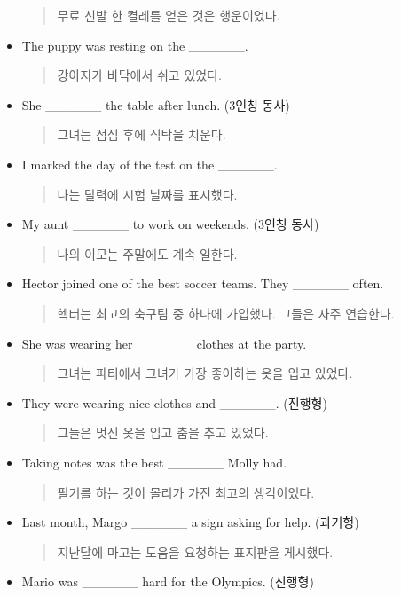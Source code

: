\documentclass{article}
\begin{document}
\begin{addmargin}[1em]{1em}
\begin{itemize}
    \begin{quote}
    무료 신발 한 켤레를 얻은 것은 행운이었다.
    \end{quote}
    \item The puppy was resting on the \_\_\_\_\_\_.
    \begin{quote}
    강아지가 바닥에서 쉬고 있었다.
    \end{quote}
    \item She \_\_\_\_\_\_ the table after lunch. (3인칭 동사)
    \begin{quote}
    그녀는 점심 후에 식탁을 치운다.
    \end{quote}
    \item I marked the day of the test on the \_\_\_\_\_\_.
    \begin{quote}
    나는 달력에 시험 날짜를 표시했다.
    \end{quote}
    \item My aunt \_\_\_\_\_\_ to work on weekends. (3인칭 동사)
    \begin{quote}
    나의 이모는 주말에도 계속 일한다.
    \end{quote}
    \newpage
    \item Hector joined one of the best soccer teams. They \_\_\_\_\_\_ often.
    \begin{quote}
    헥터는 최고의 축구팀 중 하나에 가입했다. 그들은 자주 연습한다.
    \end{quote}
    \item She was wearing her \_\_\_\_\_\_ clothes at the party.
    \begin{quote}
    그녀는 파티에서 그녀가 가장 좋아하는 옷을 입고 있었다.
    \end{quote}
    \item They were wearing nice clothes and \_\_\_\_\_\_. (진행형)
    \begin{quote}
    그들은 멋진 옷을 입고 춤을 추고 있었다.
    \end{quote}
    \item Taking notes was the best \_\_\_\_\_\_ Molly had.
    \begin{quote}
    필기를 하는 것이 몰리가 가진 최고의 생각이었다.
    \end{quote}
    \item Last month, Margo \_\_\_\_\_\_ a sign asking for help. (과거형)
    \begin{quote}
    지난달에 마고는 도움을 요청하는 표지판을 게시했다.
    \end{quote}
    \item Mario was \_\_\_\_\_\_ hard for the Olympics. (진행형)

\end{itemize}
\end{addmargin}
\end{document}
